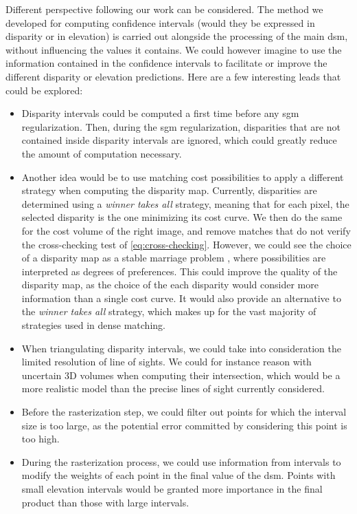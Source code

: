 Different perspective following our work can be considered. The method we developed for computing confidence intervals (would they be expressed in disparity or in elevation) is carried out alongside the processing of the main \acrshort{dsm}, without influencing the values it contains. We could however imagine to use the information contained in the confidence intervals to facilitate or improve the different disparity or elevation predictions. Here are a few interesting leads that could be explored:
\begin{itemize}
    \item Disparity intervals could be computed a first time before any \acrshort{sgm} regularization. Then, during the \acrshort{sgm} regularization, disparities that are not contained inside disparity intervals are ignored, which could greatly reduce the amount of computation necessary. 
    \item Another idea would be to use matching cost possibilities to apply a different strategy when computing the disparity map. Currently, disparities are determined using a \textit{winner takes all} strategy, meaning that for each pixel, the selected disparity is the one minimizing its cost curve. We then do the same for the cost volume of the right image, and remove matches that do not verify the cross-checking test of \cref{eq:cross-checking}. However, we could see the choice of a disparity map as a stable marriage problem \cite{irving_matching_1998}, where possibilities are interpreted as degrees of preferences. This could improve the quality of the disparity map, as the choice of the each disparity would consider more information than a single cost curve. It would also provide an alternative to the \textit{winner takes all} strategy, which makes up for the vast majority of strategies used in dense matching.  
    \item When triangulating disparity intervals, we could take into consideration the limited resolution of line of sights. We could for instance reason with uncertain 3D volumes when computing their intersection, which would be a more realistic model than the precise lines of sight currently considered.
    \item Before the rasterization step, we could filter out points for which the interval size is too large, as the potential error committed by considering this point is too high. 
    \item During the rasterization process, we could use information from intervals to modify the weights of each point in the final value of the \acrshort{dsm}. Points with small elevation intervals would be granted more importance in the final product than those with large intervals. 
\end{itemize}

\youshallnotpass
\pagebreak